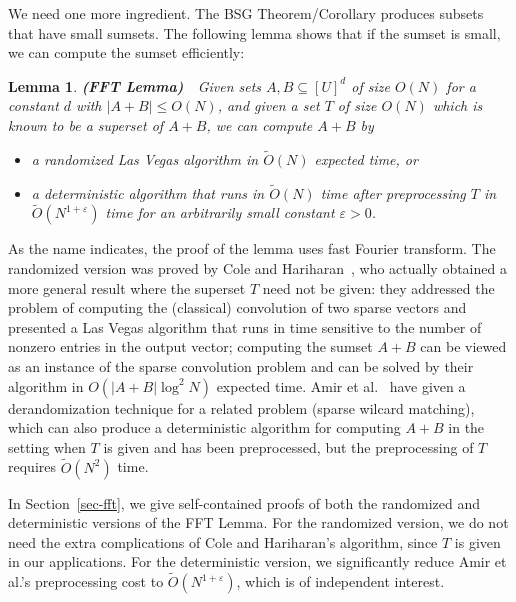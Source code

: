 \documentclass[11pt]{article}
\newcommand{\LONG}[1]{#1}\newcommand{\SHORT}[1]{}
\newtheorem{lemma}[theorem]{Lemma}
\newcommand{\eps}{\varepsilon}
\newcommand{\OO}{\widetilde{O}}
\begin{document}
We need one more ingredient.  The BSG Theorem/Corollary produces
subsets that have small sumsets.  The following lemma shows
that if the sumset is small, we can compute
the sumset efficiently:

\begin{lemma} {\bf(FFT Lemma)}\ \ Given sets $A,B\subseteq[U]^d$
of size $O(N)$ for a constant $d$ with $|A+B|\le O(N)$, and
given a set $T$ of size $O(N)$
which is known to be a superset of $A+B$, we can compute $A+B$ by
\begin{itemize}
\item[\rm (i)] a randomized Las Vegas algorithm in $\OO(N)$ expected time, or
\item[\rm (ii)] a deterministic algorithm that runs in $\OO(N)$
time after preprocessing $T$ in $\OO(N^{1+\eps})$ time for
an arbitrarily small constant $\eps>0$.
\end{itemize}
\end{lemma}

As the name indicates, the proof of the lemma uses fast Fourier transform. The randomized version
was proved by Cole and Hariharan~\cite{CH02}, who
actually obtained a more general result where the superset $T$
need not be given: they addressed the problem
of computing the (classical) convolution of two sparse vectors and
presented a Las Vegas algorithm that runs in time sensitive to the
number of nonzero entries in the output vector; computing
the sumset $A+B$ can be viewed as an instance of the
sparse convolution problem and can be solved by their algorithm
in $O(|A+B|\log^2 N)$ expected time.
Amir et al.~\cite{AKP07} have given a derandomization technique
for a related problem (sparse wilcard matching), which can also
produce a deterministic algorithm for computing $A+B$
in the setting when $T$ is given and has been preprocessed, but the preprocessing of $T$ requires $\OO(N^2)$ time.

In \LONG{Section~\ref{sec-fft}}\SHORT{the full paper},
we give self-contained proofs of both the randomized
and deterministic versions of the FFT Lemma.  For the randomized
version, we do not need the extra complications of Cole and
Hariharan's algorithm, since $T$ is given in our applications.
For the deterministic version, we significantly reduce
Amir et al.'s preprocessing cost to $\OO(N^{1+\eps})$, which is
of independent interest.
\end{document}
